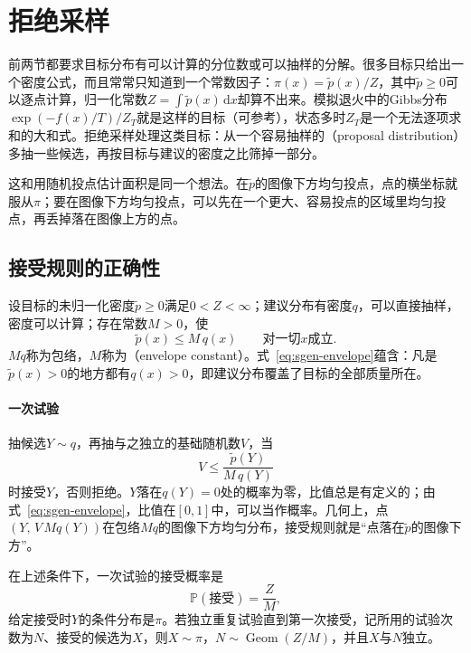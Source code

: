 \section{拒绝采样}
\label{sec:sgen-rejection}

前两节都要求目标分布有可以计算的分位数或可以抽样的分解。很多目标只给出一个密度公式，而且常常只知道到一个常数因子：$\pi(x)=\widetilde{p}(x)/Z$，其中$\widetilde{p}\ge0$可以逐点计算，归一化常数$Z=\int\widetilde{p}(x)\,\mathrm{d}x$却算不出来。模拟退火中的Gibbs分布$\exp(-f(x)/T)/Z_T$就是这样的目标（可参考），状态多时$Z_T$是一个无法逐项求和的大和式。拒绝采样处理这类目标：从一个容易抽样的（proposal distribution）多抽一些候选，再按目标与建议的密度之比筛掉一部分。

这和用随机投点估计面积是同一个想法。在$\widetilde{p}$的图像下方均匀投点，点的横坐标就服从$\pi$；要在图像下方均匀投点，可以先在一个更大、容易投点的区域里均匀投点，再丢掉落在图像上方的点。

\subsection{接受规则的正确性}
\label{sec:sgen-rejection-correct}

设目标的未归一化密度$\widetilde{p}\ge0$满足$0<Z<\infty$；建议分布有密度$q$，可以直接抽样，密度可以计算；存在常数$M>0$，使
\begin{equation}
  \widetilde{p}(x)\le M\,q(x)\qquad\text{对一切}x\text{成立}.
  \label{eq:sgen-envelope}
\end{equation}
$Mq$称为包络，$M$称为（envelope constant）。式~\eqref{eq:sgen-envelope}蕴含：凡是$\widetilde{p}(x)>0$的地方都有$q(x)>0$，即建议分布覆盖了目标的全部质量所在。

\paragraph{一次试验}
抽候选$Y\sim q$，再抽与之独立的基础随机数$V$，当
\begin{equation}
  V\le\frac{\widetilde{p}(Y)}{M\,q(Y)}
  \label{eq:sgen-accept-rule}
\end{equation}
时接受$Y$，否则拒绝。$Y$落在$q(Y)=0$处的概率为零，比值总是有定义的；由式~\eqref{eq:sgen-envelope}，比值在$[0,1]$中，可以当作概率。几何上，点$(Y,\,V\,Mq(Y))$在包络$Mq$的图像下方均匀分布，接受规则就是“点落在$\widetilde{p}$的图像下方”。

\begin{theorem}[拒绝采样]
\label{thm:sgen-rejection}
在上述条件下，一次试验的接受概率是
\begin{equation}
  \mathbb{P}(\text{接受})=\frac{Z}{M},
  \label{eq:sgen-acceptance}
\end{equation}
给定接受时$Y$的条件分布是$\pi$。若独立重复试验直到第一次接受，记所用的试验次数为$N$、接受的候选为$X$，则$X\sim\pi$，$N\sim\operatorname{Geom}(Z/M)$，并且$X$与$N$独立。
\end{theorem}

